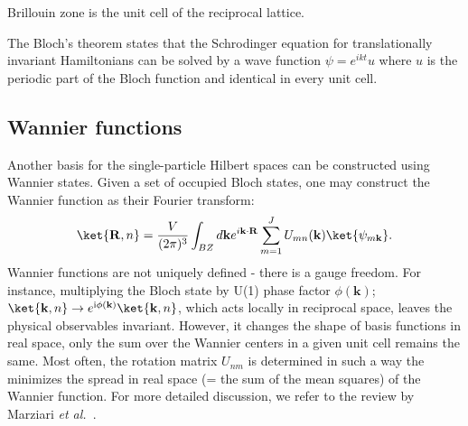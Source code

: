 Brillouin zone  is the unit cell of the reciprocal lattice.

The Bloch's theorem states that the Schrodinger equation for translationally invariant Hamiltonians can be solved by a wave function $\psi = e^{ikt} u$
where $u$ is the periodic part of the Bloch function and identical in every unit cell.




\subsection{Wannier functions}
Another basis for the single-particle Hilbert spaces can be constructed using Wannier states. Given a set of occupied Bloch states, one may construct the Wannier function as their Fourier transform:
\begin{equation}
\ket{\mathbf{R}, n} = \frac{V}{(2 \pi)^3} \int_{BZ} d \mathbf{k} e^{i \mathbf{k} \cdot \mathbf{R}} \sum_{m = 1}^J U_{mn} (\mathbf{k}) \ket{\psi_{m\mathbf{k}}}.
\label{eq:wannier}
\end{equation}
Wannier functions are not uniquely defined - there is a gauge freedom. For instance, multiplying the Bloch state by U(1) phase factor $\phi( \mathbf{k} )$; $\ket{\mathbf{k}, n} \rightarrow e^{\textnormal{i} \phi( \mathbf{k} )} \ket{\mathbf{k}, n}$, which acts locally in reciprocal space, leaves the physical observables invariant. However, it changes the shape of basis functions in real space, only the sum over the Wannier centers in a given unit cell remains the same. Most often, the rotation matrix $U_{nm}$ is determined in such a way the minimizes the spread in real space (= the sum of the mean squares) of the Wannier function. For more detailed discussion, we refer to the review by Marziari \emph{et al.}~\cite{MarziariWF2012}. 

